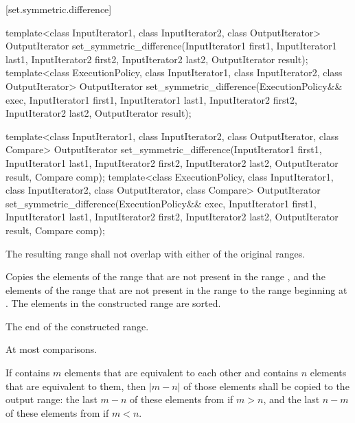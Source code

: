 [set.symmetric.difference]{}

%
\begin{itemdecl}
template<class InputIterator1, class InputIterator2,
         class OutputIterator>
  OutputIterator
    set_symmetric_difference(InputIterator1 first1, InputIterator1 last1,
                             InputIterator2 first2, InputIterator2 last2,
                             OutputIterator result);
template<class ExecutionPolicy, class InputIterator1, class InputIterator2,
         class OutputIterator>
  OutputIterator
    set_symmetric_difference(ExecutionPolicy&& exec,
                             InputIterator1 first1, InputIterator1 last1,
                             InputIterator2 first2, InputIterator2 last2,
                             OutputIterator result);

template<class InputIterator1, class InputIterator2,
         class OutputIterator, class Compare>
  OutputIterator
    set_symmetric_difference(InputIterator1 first1, InputIterator1 last1,
                             InputIterator2 first2, InputIterator2 last2,
                             OutputIterator result, Compare comp);
template<class ExecutionPolicy, class InputIterator1, class InputIterator2,
         class OutputIterator, class Compare>
  OutputIterator
    set_symmetric_difference(ExecutionPolicy&& exec,
                             InputIterator1 first1, InputIterator1 last1,
                             InputIterator2 first2, InputIterator2 last2,
                             OutputIterator result, Compare comp);
\end{itemdecl}

\begin{itemdescr}
\pnum
\requires
The resulting range shall not overlap with either of the original ranges.

\pnum
\effects
Copies the elements of the range
that are not present in the range
,
and the elements of the range
that are not present in the range
to the range beginning at
.
The elements in the constructed range are sorted.

\pnum
\returns
The end of the constructed range.

\pnum
\complexity
At most
comparisons.

\pnum
\remarks
If  contains $m$ elements that are equivalent to each other and
 contains $n$ elements that are equivalent to them, then
$|m - n|$ of those elements shall be copied to the output range: the last
$m - n$ of these elements from  if $m > n$, and the last
$n - m$ of these elements from  if $m < n$.
\end{itemdescr}

